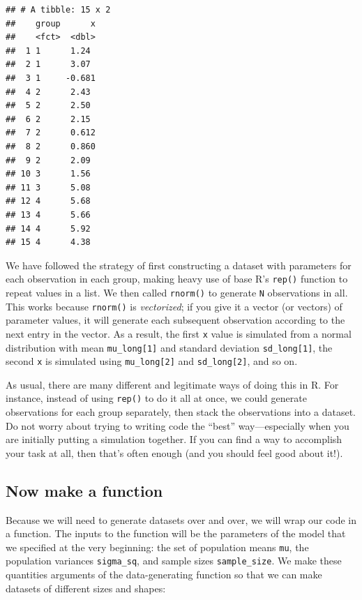 \documentclass[
]{book}
\begin{document}
\begin{verbatim}
## # A tibble: 15 x 2
##    group      x
##    <fct>  <dbl>
##  1 1      1.24 
##  2 1      3.07 
##  3 1     -0.681
##  4 2      2.43 
##  5 2      2.50 
##  6 2      2.15 
##  7 2      0.612
##  8 2      0.860
##  9 2      2.09 
## 10 3      1.56 
## 11 3      5.08 
## 12 4      5.68 
## 13 4      5.66 
## 14 4      5.92 
## 15 4      4.38
\end{verbatim}

We have followed the strategy of first constructing a dataset with parameters for each observation in each group, making heavy use of base R's \texttt{rep()} function to repeat values in a list.
We then called \texttt{rnorm()} to generate \texttt{N} observations in all.
This works because \texttt{rnorm()} is \emph{vectorized}; if you give it a vector (or vectors) of parameter values, it will generate each subsequent observation according to the next entry in the vector. As a result, the first \texttt{x} value is simulated from a normal distribution with mean \texttt{mu\_long{[}1{]}} and standard deviation \texttt{sd\_long{[}1{]}}, the second \texttt{x} is simulated using \texttt{mu\_long{[}2{]}} and \texttt{sd\_long{[}2{]}}, and so on.

As usual, there are many different and legitimate ways of doing this in R.
For instance, instead of using \texttt{rep()} to do it all at once, we could generate observations for each group separately, then stack the observations into a dataset.
Do not worry about trying to writing code the ``best'' way---especially when you are initially putting a simulation together.
If you can find a way to accomplish your task at all, then that's often enough (and you should feel good about it!).

\subsection{Now make a function}\label{now-make-a-function}

Because we will need to generate datasets over and over, we will wrap our code in a function.
The inputs to the function will be the parameters of the model that we specified at the very beginning: the set of population means \texttt{mu}, the population variances \texttt{sigma\_sq}, and sample sizes \texttt{sample\_size}. We make these quantities arguments of the data-generating function so that we can make datasets of different sizes and shapes:
\end{document}
